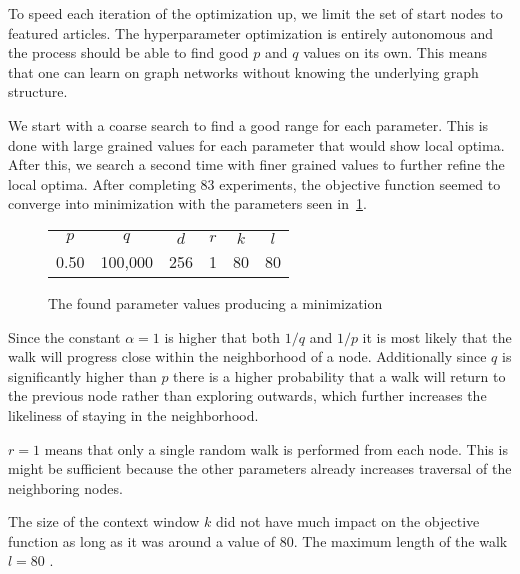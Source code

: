 To speed each iteration of the optimization up, we limit the set of start nodes to featured articles. The hyperparameter optimization is entirely autonomous and the process should be able to find good $p$ and $q$ values on its own. This means that one can learn on graph networks without knowing the underlying graph structure.

We start with a coarse search to find a good range for each parameter. This is done with large grained values for each parameter that would show local optima. After this, we search a second time with finer grained values to further refine the local optima. After completing 83 experiments, the objective function seemed to converge  into minimization with the parameters seen in~\cref{tab:paramopt_goodvalues}.

\begin{figure}%
\centering
\begin{tabular}{cccccc}
\toprule
$p$  & $q$     & $d$ & $r$ & $k$ & $l$ \\
0.50 & 100,000 & 256 & 1   & 80  & 80 \\
\bottomrule
\end{tabular}
\caption[The found parameter values producing a minimization]{The found parameter values producing a minimization }%
\label{tab:paramopt_goodvalues}%
\end{figure}


Since the constant $\alpha = 1$ is higher that both $1/q$ and $1/p$ it is most likely that the walk will progress close within the neighborhood of a node. Additionally since $q$ is significantly higher than $p$ there is a higher probability that a walk will return to the previous node rather than exploring outwards, which further increases the likeliness of staying in the neighborhood.

$r=1$ means that only a single random walk is performed from each node. This is might be sufficient because the other parameters already increases traversal of the neighboring nodes.

The size of the context window $k$ did not have much impact on the objective function as long as it was around a value of 80. The maximum length of the walk $l=80$ .

